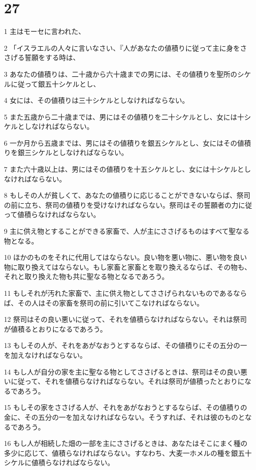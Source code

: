 \chapter{27}

\par 1 主はモーセに言われた、
\par 2 「イスラエルの人々に言いなさい、『人があなたの値積りに従って主に身をささげる誓願をする時は、
\par 3 あなたの値積りは、二十歳から六十歳までの男には、その値積りを聖所のシケルに従って銀五十シケルとし、
\par 4 女には、その値積りは三十シケルとしなければならない。
\par 5 また五歳から二十歳までは、男にはその値積りを二十シケルとし、女には十シケルとしなければならない。
\par 6 一か月から五歳までは、男にはその値積りを銀五シケルとし、女にはその値積りを銀三シケルとしなければならない。
\par 7 また六十歳以上は、男にはその値積りを十五シケルとし、女には十シケルとしなければならない。
\par 8 もしその人が貧しくて、あなたの値積りに応じることができないならば、祭司の前に立ち、祭司の値積りを受けなければならない。祭司はその誓願者の力に従って値積らなければならない。
\par 9 主に供え物とすることができる家畜で、人が主にささげるものはすべて聖なる物となる。
\par 10 ほかのものをそれに代用してはならない。良い物を悪い物に、悪い物を良い物に取り換えてはならない。もし家畜と家畜とを取り換えるならば、その物も、それと取り換えた物も共に聖なる物となるであろう。
\par 11 もしそれが汚れた家畜で、主に供え物としてささげられないものであるならば、その人はその家畜を祭司の前に引いてこなければならない。
\par 12 祭司はその良い悪いに従って、それを値積らなければならない。それは祭司が値積るとおりになるであろう。
\par 13 もしその人が、それをあがなおうとするならば、その値積りにその五分の一を加えなければならない。
\par 14 もし人が自分の家を主に聖なる物としてささげるときは、祭司はその良い悪いに従って、それを値積らなければならない。それは祭司が値積ったとおりになるであろう。
\par 15 もしその家をささげる人が、それをあがなおうとするならば、その値積りの金に、その五分の一を加えなければならない。そうすれば、それは彼のものとなるであろう。
\par 16 もし人が相続した畑の一部を主にささげるときは、あなたはそこにまく種の多少に応じて、値積らなければならない。すなわち、大麦一ホメルの種を銀五十シケルに値積らなければならない。
